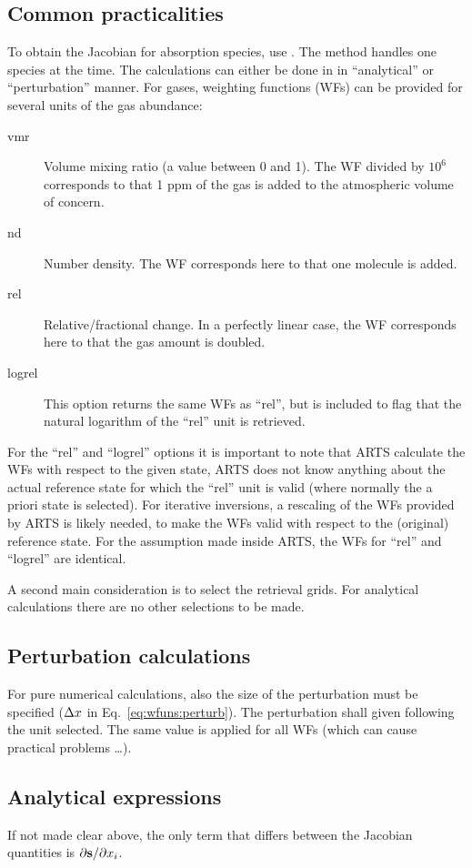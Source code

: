 \subsection{Common practicalities}
%
To obtain the Jacobian for absorption species, use
. The method handles one species at the time.
The calculations can either be done in in ``analytical'' or ``perturbation''
manner. For gases, weighting functions (WFs) can be provided for several units
of the gas abundance:
\begin{description}
\item[vmr] Volume mixing ratio (a value between 0 and 1). The WF divided by
  $10^6$ corresponds to that 1 ppm of the gas is added to the atmospheric
  volume of concern.
\item[nd] Number density. The WF corresponds here to that one molecule is added.
\item[rel] Relative/fractional change. In a perfectly linear case, the WF
  corresponds here to that the gas amount is doubled.
\item[logrel] This option returns the same WFs as ``rel'', but is included to
  flag that the natural logarithm of the ``rel'' unit is retrieved.
\end{description}
For the ``rel'' and ``logrel'' options it is important to note that ARTS
calculate the WFs with respect to the given state, ARTS does not know anything
about the actual reference state for which the ``rel'' unit is valid (where
normally the a priori state is selected). For iterative inversions, a rescaling
of the WFs provided by ARTS is likely needed, to make the WFs valid with
respect to the (original) reference state. For the assumption made inside ARTS,
the WFs for ``rel'' and ``logrel'' are identical.

A second main consideration is to select the retrieval grids. For analytical
calculations there are no other selections to be made. 


\subsection{Perturbation calculations}
%
For pure numerical calculations, also the size of the perturbation must be
specified ($\Delta x$ in Eq.~\ref{eq:wfuns:perturb}). The perturbation
shall given following the unit selected. The same value is applied for all WFs
(which can cause practical problems \dots).


\subsection{Analytical expressions}
%
If not made clear above, the only term that differs between the Jacobian
quantities is $\partial{\bf s}/\partial x_{i}$.

